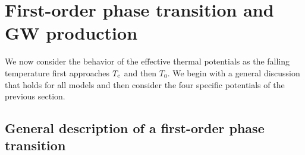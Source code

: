 \documentclass[a4paper,11pt]{article}
\begin{document}
\section{First-order phase transition and GW production}

We now consider the behavior of the effective thermal potentials as the falling temperature first approaches $T_{\rm c}$ and then $T_0$. 
We begin with a general discussion that holds for all models and then consider the four specific
potentials of the previous section.

\subsection{General description of a first-order phase transition}
\end{document}
